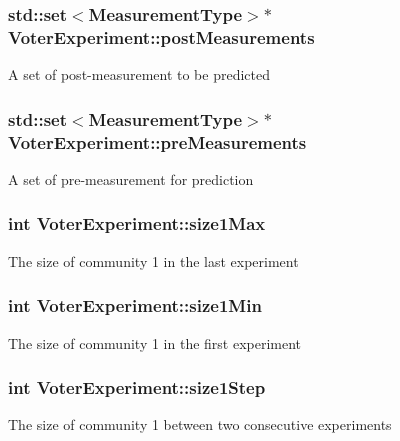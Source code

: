 \subsubsection[{post\+Measurements}]{\setlength{\rightskip}{0pt plus 5cm}std\+::set$<${\bf Measurement\+Type}$>$$\ast$ Voter\+Experiment\+::post\+Measurements}\label{class_voter_experiment_a858051eb0f9c27891f50ddfb982b2534}
A set of post-\/measurement to be predicted \hypertarget{class_voter_experiment_a1de8c983105c4c2dabe6155f716bef93}{}
\subsubsection[{pre\+Measurements}]{\setlength{\rightskip}{0pt plus 5cm}std\+::set$<${\bf Measurement\+Type}$>$$\ast$ Voter\+Experiment\+::pre\+Measurements}\label{class_voter_experiment_a1de8c983105c4c2dabe6155f716bef93}
A set of pre-\/measurement for prediction \hypertarget{class_voter_experiment_a351c47da6acaf3e4310d8eaed8471dc3}{}
\subsubsection[{size1\+Max}]{\setlength{\rightskip}{0pt plus 5cm}int Voter\+Experiment\+::size1\+Max}\label{class_voter_experiment_a351c47da6acaf3e4310d8eaed8471dc3}
The size of community 1 in the last experiment \hypertarget{class_voter_experiment_a2f6b6040d2fb3f5d44276e0c9a137806}{}
\subsubsection[{size1\+Min}]{\setlength{\rightskip}{0pt plus 5cm}int Voter\+Experiment\+::size1\+Min}\label{class_voter_experiment_a2f6b6040d2fb3f5d44276e0c9a137806}
The size of community 1 in the first experiment \hypertarget{class_voter_experiment_aca18061e6ee12ea935792b34fe245d87}{}
\subsubsection[{size1\+Step}]{\setlength{\rightskip}{0pt plus 5cm}int Voter\+Experiment\+::size1\+Step}\label{class_voter_experiment_aca18061e6ee12ea935792b34fe245d87}
The size of community 1 between two consecutive experiments \hypertarget{class_voter_experiment_a5a0a8935b13623bb196fda30c8c5e0e0}{}
